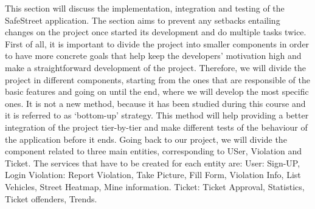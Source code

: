 This section will discuss the implementation, integration and testing of the SafeStreet application. The section aims to prevent any setbacks entailing changes on the project once started its development and do multiple tasks twice. First of all, it is important to divide the project into smaller components in order to have more concrete goals that help keep the developers’ motivation high and make a straightforward development of the project. Therefore, we will divide the project in diﬀerent components, starting from the ones that are responsible of the basic features and going on until the end, where we will develop the most speciﬁc ones. It is not a new method, because it has been studied during this course and it is referred to as ‘bottom-up’ strategy. This method will help providing a better integration of the project tier-by-tier and make diﬀerent tests of the behaviour of the application before it ends. Going back to our project, we will divide the component related to three main entities, corresponding to USer, Violation and Ticket.
The services that have to be created for each entity are:
User: Sign-UP, Login
Violation: Report Violation, Take Picture, Fill Form, Violation Info, List Vehicles, Street Heatmap, Mine information.
Ticket: Ticket Approval, Statistics, Ticket offenders, Trends.

